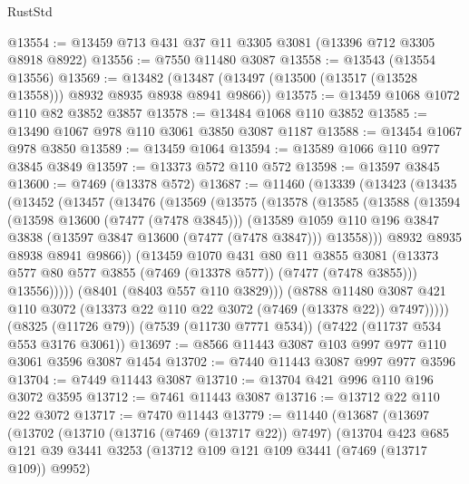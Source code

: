 \begin{lexlean}{RustStd}
\begin{coremodule}
@13554 := @13459 @713 @431 @37 @11 @3305 @3081 (@13396 @712 @3305 @8918 @8922)
@13556 := @7550 @11480 @3087
@13558 := @13543 (@13554 @13556)
@13569 := @13482 (@13487 (@13497 (@13500 (@13517 (@13528 @13558))) @8932 @8935 @8938 @8941 @9866))
@13575 := @13459 @1068 @1072 @110 @82 @3852 @3857
@13578 := @13484 @1068 @110 @3852
@13585 := @13490 @1067 @978 @110 @3061 @3850 @3087 @1187
@13588 := @13454 @1067 @978 @3850
@13589 := @13459 @1064
@13594 := @13589 @1066 @110 @977 @3845 @3849
@13597 := @13373 @572 @110 @572
@13598 := @13597 @3845
@13600 := @7469 (@13378 @572)
@13687 := @11460
    (@13339
      (@13423
        (@13435
          (@13452
            (@13457
              (@13476
                (@13569
                  (@13575
                    (@13578
                      (@13585
                        (@13588
                          (@13594
                            (@13598 @13600 (@7477 (@7478 @3845)))
                            (@13589
                              @1059
                              @110
                              @196
                              @3847
                              @3838
                              (@13597 @3847 @13600 (@7477 (@7478 @3847)))
                              @13558)))
                        @8932
                        @8935
                        @8938
                        @8941
                        @9866))
                    (@13459
                      @1070
                      @431
                      @80
                      @11
                      @3855
                      @3081
                      (@13373 @577 @80 @577 @3855 (@7469 (@13378 @577)) (@7477 (@7478 @3855)))
                      @13556)))))
            (@8401 (@8403 @557 @110 @3829)))
          (@8788
            @11480
            @3087
            @421
            @110
            @3072
            (@13373 @22 @110 @22 @3072 (@7469 (@13378 @22)) @7497)))))
    (@8325 (@11726 @79))
    (@7539 (@11730 @7771 @534))
    (@7422 (@11737 @534 @553 @3176 @3061))
@13697 := @8566 @11443 @3087 @103 @997 @977 @110 @3061 @3596 @3087 @1454
@13702 := @7440 @11443 @3087 @997 @977 @3596
@13704 := @7449 @11443 @3087
@13710 := @13704 @421 @996 @110 @196 @3072 @3595
@13712 := @7461 @11443 @3087
@13716 := @13712 @22 @110 @22 @3072
@13717 := @7470 @11443
@13779 := @11440
    (@13687
      (@13697
        (@13702
          (@13710
            (@13716 (@7469 (@13717 @22)) @7497)
            (@13704
              @423
              @685
              @121
              @39
              @3441
              @3253
              (@13712 @109 @121 @109 @3441 (@7469 (@13717 @109)) @9952)

\end{coremodule}
\end{lexlean}
